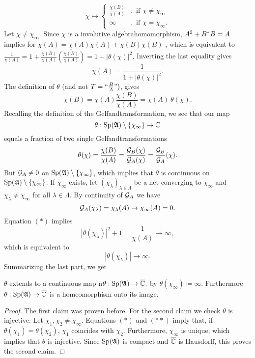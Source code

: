 \[
 \chi \mapsto 
  \begin{cases}
    \frac{\chi(B)}{\chi(A)} &, \text{ if }\chi \neq \chi_\infty\\
    \infty &, \text{ if } \chi = \chi_\infty.
    \end{cases}
 \]
 Let $\chi \neq \chi_\infty$. Since $\chi$ is a involutive algebrahomomorphism, $A^2 + B^{*} B = A$ implies for
   $\chi(A) = \chi(A) \overline{\chi(A)} + \chi(B) \overline{\chi(B)} $
, which is equivalent to  
  $ \frac{1}{\chi(A)} = 1 + \frac{\chi(B)}{\chi(A)} 
  \overline{\left( \frac{\chi(B)}{\chi(A)} \right)} = 1 + | \theta(\chi)|^2.$
 Inverting the last equality gives
\[
 \chi(A) = \frac{1}{1 + |\theta (\chi)|^2} \tag{$\ast$}.
\]
The definition of $\theta$ (and not  $T = 
`` \frac{B}{A} ")$, gives
\[
 \chi(B) = \chi(A) \frac{\chi(B)}{\chi(A)}= \chi(A)~ \theta(\chi) 
 \tag{$\ast \ast$}.
\]
Recalling the definition of the Gelfandtransformation, we see that our map
\[
 \theta : \operatorname{Sp}(\mathfrak{A}) \setminus \left\lbrace\chi_\infty\right\rbrace \to \mathbb{C}
\]
equals a fraction of two single Gelfandtransformations
\[
 \theta(\chi) = \frac{\chi(B)}{\chi(A)} = \frac{\mathcal{G}_B (\chi)}{\mathcal{G}_A (\chi)}=
 \frac{\mathcal{G}_B}{\mathcal{G}_A}(\chi).
\]
But $\mathcal{G}_A \neq 0$ on $\operatorname{Sp}(\mathfrak{A}) \setminus \left\lbrace\chi_\infty\right\rbrace$, which implies
that $\theta$ is continuous on $\operatorname{Sp}(\mathfrak{A}) \setminus \left\lbrace\chi_\infty\right\rbrace$.
If $\chi_\infty$ exists, let $ \left( \chi_\lambda \right) 
_{\lambda \in \Lambda}$ be a net converging to $\chi_\infty$ and 
$\chi_\lambda \neq \chi_\infty$ for all $\lambda \in \Lambda$. 
By continuity of $\mathcal{G}_A$ we have
\[
 \mathcal{G}_A (\chi_\lambda) = \chi_\lambda (A) \to \chi_\infty (A) = 0.
\]
Equation $(\ast)$ implies
\[
 | \theta( \chi_\lambda ) | ^2  + 1 = \frac{1}{\chi(A)} \to \infty,
\]
which is equivalent to 
\[
 | \theta (\chi_\lambda ) | \to \infty.
\]
Summarizing the last part, we get 
\begin{lem}
$\theta$ extends to a continuous map n$ \theta : \operatorname{Sp}(\mathfrak{A}) \to {\overline{\mathbb{C}}},$
by $\theta (\chi_\infty) \coloneqq \infty$.
Furthermore $\theta : \operatorname{Sp} (\mathfrak{A}) \to {\overline{\mathbb{C}}}$ is a homeomorphism onto its image.
\end{lem}

\begin{proof}
The first claim was proven before. For the second claim we check 
$\theta$ is injective:
Let $\chi_1 , \chi_2 \neq \chi_\infty$. Equations $(\ast)$ and $(\ast \ast)$
imply that, if $\theta (\chi_1)= \theta( \chi_2)$, \newline $\chi_1$ coincides with
$\chi_2$. Furthermore, $\chi_\infty$ is unique, which implies that $\theta$
is injective. Since $\operatorname{Sp} (\mathfrak{A})$ is compact and ${\overline{\mathbb{C}}}$ is Hausdorff, 
this proves the second claim.
\end{proof}

